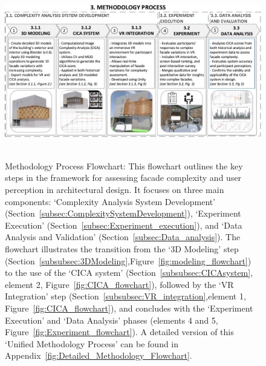 \begin{linenumbers}
\begin{figure}[!htb]
\centering
\includegraphics[width=\linewidth]{Images/MethodologyFlowchart}~
\caption{
Methodology Process Flowchart: This flowchart outlines the key steps in the framework for assessing facade complexity and user perception in architectural design. It focuses on three main components: `Complexity Analysis System Development' (Section~\ref{subsec:ComplexitySystemDevelopment}), `Experiment Execution' (Section~\ref{subsec:Experiment_execution}), and `Data Analysis and Validation' (Section~\ref{subsec:Data_analysis}). The flowchart illustrates the transition from the `3D Modeling' step (Section~\ref{subsubsec:3DModeling},Figure~\ref{fig:modeling_flowchart}) to the use of the `CICA system' (Section~\ref{subsubsec:CICAsystem}, element 2, Figure~\ref{fig:CICA_flowchart}), followed by the `VR Integration' step (Section~\ref{subsubsec:VR_integration},element 1, Figure~\ref{fig:CICA_flowchart}), and concludes with the `Experiment Execution' and `Data Analysis' phases (elements 4 and 5, Figure~\ref{fig:Experiment_flowchart}). A detailed version of this `Unified Methodology Process' can be found in Appendix~\ref{fig:Detailed_Methodology_Flowchart}.
}
\label{fig:MethodologyFlowchartComplexity}
\end{figure}


\end{linenumbers}
